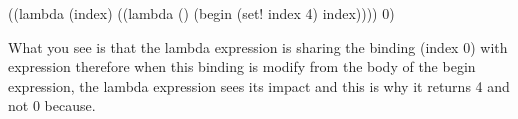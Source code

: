 \documentclass[a4paper,10pt,twoside]{book}
\begin{document}
\begin{code}{}
((lambda (index)
   ((lambda () (begin 
                (set! index 4)
                index))))
 0)
\end{code}


What you see is that the lambda expression is sharing the binding (index 0) with expression 
therefore when this binding is modify from the body of the begin expression, the lambda expression sees its impact
and this is why it returns 4 and not 0 because. 

\ifx\wholebook\relax\else
   
   
\end{document}
